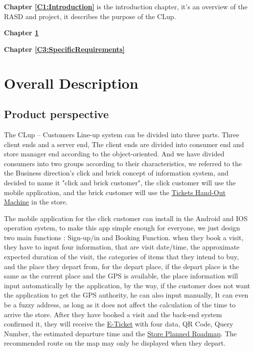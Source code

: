 \documentclass[a4paper,12pt]{book}
\begin{document}
\textbf{Chapter \ref{C1:Introduction}} is the introduction chapter, it's an overview of the RASD and project, 
it describes the purpose of the CLup.

\textbf{Chapter \ref{C2:OverallDescription}} 

\textbf{Chapter \ref{C3:SpecificRequirements}} 






\chapter{Overall Description} \label{C2:OverallDescription}
\section{Product perspective}

The CLup – Customers Line-up system can be divided into three parts. Three client ends and a server end, The client ends are divided into consumer end and store manager end according to the object-oriented. And we have divided consumers into two groups according to their characteristics, we referred to the the Business direction's click and brick concept of information system, and decided to name it "click and brick customer", the click customer will use the mobile application, and the brick customer will use the \hyperref[Definitions]{Tickets Hand-Out Machine} in the store.

The mobile application for the click customer can install in the Android and IOS operation system, to make this app simple enough for everyone, we just design two main functions : Sign-up/in and Booking Function. when they book a visit, they have to input four information, that are visit date/time, the approximate expected duration of the visit, the categories of items that they intend to buy, and the place they depart from, for the depart place, if the depart place is the same as the current place and the GPS is available, the place information will input automatically by the application, by the way, if the customer does not want the application to get the GPS authority, he can also input manually, It can even be a fuzzy address, as long as it does not affect the calculation of the time to arrive the store. After they have booked a visit and the back-end system confirmed it, they will receive the \hyperref[Definitions]{E-Ticket} with four data, QR Code, Query Number, the estimated departure time and the \hyperref[Definitions]{Store Planned Roadmap}. The recommended route on the map may only be displayed when they depart.
\end{document}
